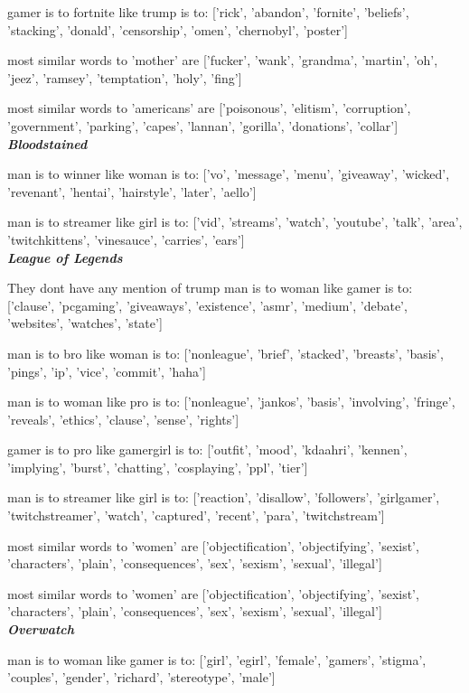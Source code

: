 gamer is to fortnite like trump is to: ['rick', 'abandon', 'fornite', 'beliefs', 'stacking', 'donald', 'censorship', 'omen', 'chernobyl', 'poster']

most similar words to 'mother' are ['fucker', 'wank', 'grandma', 'martin', 'oh', 'jeez', 'ramsey', 'temptation', 'holy', 'fing']

most similar words to 'americans' are ['poisonous', 'elitism', 'corruption', 'government', 'parking', 'capes', 'lannan', 'gorilla', 'donations', 'collar']
\\

\textbf{\emph{Bloodstained}}

man is to winner like woman is to: ['vo', 'message', 'menu', 'giveaway', 'wicked', 'revenant', 'hentai', 'hairstyle', 'later', 'aello']

man is to streamer like girl is to: ['vid', 'streams', 'watch', 'youtube', 'talk', 'area', 'twitchkittens', 'vinesauce', 'carries', 'ears']\\

\textbf{\emph{League of Legends}}

They dont have any mention of trump
man is to woman like gamer is to: ['clause', 'pcgaming', 'giveaways', 'existence', 'asmr', 'medium', 'debate', 'websites', 'watches', 'state']

man is to bro like woman is to: ['nonleague', 'brief', 'stacked', 'breasts', 'basis', 'pings', 'ip', 'vice', 'commit', 'haha']

man is to woman like pro is to: ['nonleague', 'jankos', 'basis', 'involving', 'fringe', 'reveals', 'ethics', 'clause', 'sense', 'rights']

gamer is to pro like gamergirl is to: ['outfit', 'mood', 'kdaahri', 'kennen', 'implying', 'burst', 'chatting', 'cosplaying', 'ppl', 'tier']

man is to streamer like girl is to: ['reaction', 'disallow', 'followers', 'girlgamer', 'twitchstreamer', 'watch', 'captured', 'recent', 'para', 'twitchstream']

most similar words to 'women' are ['objectification', 'objectifying', 'sexist', 'characters', 'plain', 'consequences', 'sex', 'sexism', 'sexual', 'illegal']

most similar words to 'women' are ['objectification', 'objectifying', 'sexist', 'characters', 'plain', 'consequences', 'sex', 'sexism', 'sexual', 'illegal'] \\

\textbf{\emph{Overwatch}}

man is to woman like gamer is to: ['girl', 'egirl', 'female', 'gamers', 'stigma', 'couples', 'gender', 'richard', 'stereotype', 'male']

